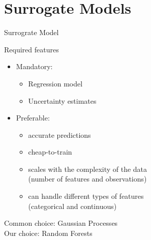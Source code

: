 \section{Surrogate Models}
\begin{frame}[c,fragile]{Surrograte Model}

Required features

\begin{itemize}
	\item Mandatory:
	\begin{itemize}
		\item Regression model
		\item Uncertainty estimates
	\end{itemize}
	\pause
	\item Preferable:
	\begin{itemize}
		\item accurate predictions
		\item cheap-to-train
		\item scales with the complexity of the data\\ (number of features and observations)
		\item can handle different types of features\\ (categorical and continuous)
	\end{itemize}
\end{itemize}

\pause
Common choice: Gaussian Processes\\
Our choice: Random Forests

\end{frame}
